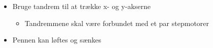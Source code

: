 \begin{itemize}
{    
    \label{fig:plotterskitse}
  }
\item Bruge tandrem til at trække x- og y-akserne
  \begin{itemize}
  \item Tandremmene skal være forbundet med et par stepmotorer
  \end{itemize}
\item Pennen kan løftes og sænkes
\end{itemize}

